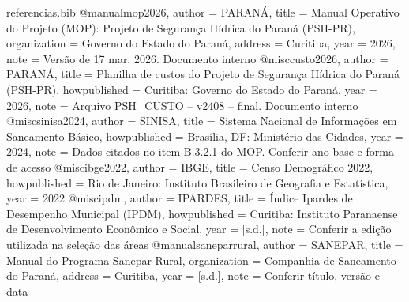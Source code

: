 %
%

\begin{filecontents*}[overwrite]{referencias.bib}
@manual{mop2026,
  author       = {{PARANÁ}},
  title        = {Manual Operativo do Projeto (MOP): Projeto de Segurança Hídrica do Paraná (PSH-PR)},
  organization = {Governo do Estado do Paraná},
  address      = {Curitiba},
  year         = {2026},
  note         = {Versão de 17 mar. 2026. Documento interno}
}
@misc{custo2026,
  author       = {{PARANÁ}},
  title        = {Planilha de custos do Projeto de Segurança Hídrica do Paraná (PSH-PR)},
  howpublished = {Curitiba: Governo do Estado do Paraná},
  year         = {2026},
  note         = {Arquivo PSH\_CUSTO -- v2408 -- final. Documento interno}
}
@misc{sinisa2024,
  author       = {{SINISA}},
  title        = {Sistema Nacional de Informações em Saneamento Básico},
  howpublished = {Brasília, DF: Ministério das Cidades},
  year         = {2024},
  note         = {Dados citados no item B.3.2.1 do MOP. Conferir ano-base e forma de acesso}
}
@misc{ibge2022,
  author       = {{IBGE}},
  title        = {Censo Demográfico 2022},
  howpublished = {Rio de Janeiro: Instituto Brasileiro de Geografia e Estatística},
  year         = {2022}
}
@misc{ipdm,
  author       = {{IPARDES}},
  title        = {Índice Ipardes de Desempenho Municipal (IPDM)},
  howpublished = {Curitiba: Instituto Paranaense de Desenvolvimento Econômico e Social},
  year         = {{[s.d.]}},
  note         = {Conferir a edição utilizada na seleção das áreas}
}
@manual{saneparrural,
  author       = {{SANEPAR}},
  title        = {Manual do Programa Sanepar Rural},
  organization = {Companhia de Saneamento do Paraná},
  address      = {Curitiba},
  year         = {{[s.d.]}},
  note         = {Conferir título, versão e data}
}
\end{filecontents*}

